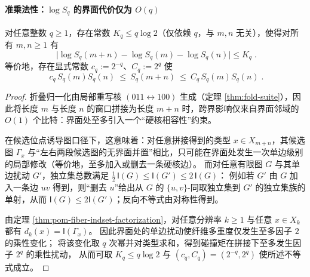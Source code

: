 \paragraph{准乘法性：\texorpdfstring{$\log S_q$}{log Sq} 的界面代价仅为 \texorpdfstring{$O(q)$}{O(q)}}
\begin{proposition}[碰撞矩的准乘法性与近似子加性]\label{prop:pom-sq-quasi-multiplicative}
对任意整数 \(q\ge 1\)，存在常数 \(K_q\le q\log 2\)（仅依赖 \(q\)，与 \(m,n\) 无关），使得对所有 \(m,n\ge 1\) 有
\[
\boxed{\;
\bigl|\log S_q(m+n)-\log S_q(m)-\log S_q(n)\bigr|\le K_q\; }.
\]
等价地，存在显式常数 \(c_q:=2^{-q}\)、\(C_q:=2^{q}\) 使
\[
\boxed{\;
c_q\,S_q(m)S_q(n)\ \le\ S_q(m+n)\ \le\ C_q\,S_q(m)S_q(n)\; }.
\]
\end{proposition}
\begin{proof}
折叠归一化由局部重写核 \((011\leftrightarrow 100)\) 生成（定理 \ref{thm:fold-suite}），因此将长度 \(m\) 与长度 \(n\) 的窗口拼接为长度 \(m+n\) 时，跨界影响仅来自界面邻域的 \(O(1)\) 个比特：界面处至多引入一个“硬核相容性”约束。
\par
在候选位点诱导图口径下，这意味着：对任意拼接得到的类型 \(x\in X_{m+n}\)，其候选图 \(\Gamma_x\) 与“左右两段候选图的无界面并置”相比，只可能在界面处发生一次单边级别的局部修改（等价地，至多加入或删去一条硬核边）。
而对任意有限图 \(G\) 与其单边扰动 \(G'\)，独立集总数满足
\(
\tfrac12\,\mathsf{I}(G)\le \mathsf{I}(G')\le 2\,\mathsf{I}(G)
\)：
例如若 \(G'\) 由 \(G\) 加入一条边 \(uv\) 得到，则“删去 \(u\)”给出从 \(G\) 的 \(\{u,v\}\)-同取独立集到 \(G'\) 的独立集族的单射，从而 \(\mathsf{I}(G)\le 2\mathsf{I}(G')\)；反向不等式由对称性得到。
\par
由定理 \ref{thm:pom-fiber-indset-factorization}，对任意分辨率 \(k\ge 1\) 与任意 \(x\in X_k\) 都有 \(d_k(x)=\mathsf{I}(\Gamma_x)\)。
因此界面处的单边扰动使纤维多重度仅发生至多因子 \(2\) 的乘性变化；
将该变化取 \(q\) 次幂并对类型求和，得到碰撞矩在拼接下至多发生因子 \(2^q\) 的乘性扰动，
从而可取 \(K_q\le q\log 2\) 与 \((c_q,C_q)=(2^{-q},2^q)\) 使所述不等式成立。
\end{proof}

